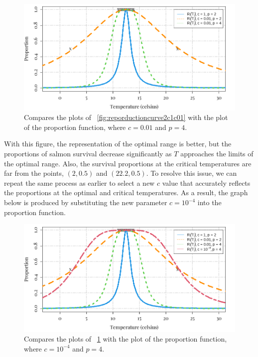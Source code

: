 \begin{figure}[H]
    \centering
    \includegraphics[width=14cm]{Pictures/Salmon Pop/salmon repo model/Repo c1 c01 p4 c01.png}
    \caption{\singlespacing
    Compares the plots of \figureautorefname~\ref{fig:reporductioncurve2c1c01} with the plot of the proportion function, where $c=0.01$ and $p=4$.}
    \label{fig:reproductioncurve2_4_c01}
\end{figure}
With this figure, the representation of the optimal range is better, but the proportions of salmon survival decrease significantly as $T$ approaches the limits of the optimal range.
Also, the survival proportions at the critical temperatures are far from the points, $(2,0.5)$ and $(22.2,0.5)$.
To resolve this issue, we can repeat the same process as earlier to select a new $c$ value that accurately reflects the proportions at the optimal and critical temperatures.
As a result, the graph below is produced by substituting the new parameter $c=10^{-4}$ into the proportion function.
\begin{figure}[H]
    \centering
    \includegraphics[width=14cm]{Pictures/Salmon Pop/salmon repo model/Repo_all.png}
    \caption{\singlespacing
    Compares the plots of \figureautorefname~\ref{fig:reproductioncurve2_4_c01} with the plot of the proportion function, where $c=10^{-4}$ and $p=4$.}
    \label{fig:reproductioncurve4}
\end{figure}
